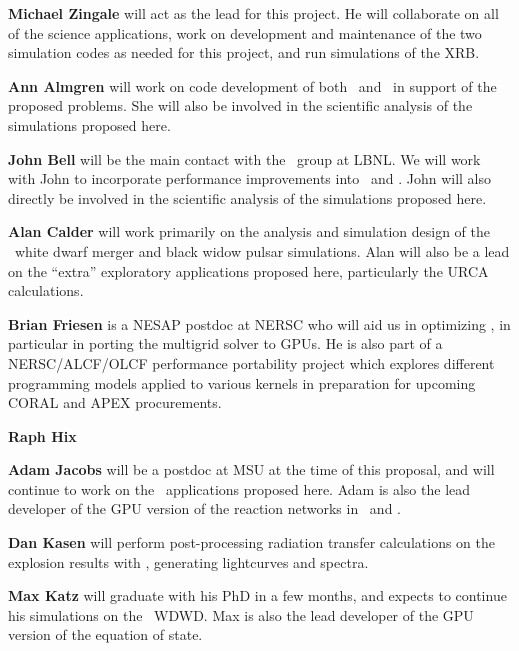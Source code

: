 \documentclass[11pt,letterpaper,english]{article}
\begin{document}
\begin{tightitem}
\item {\bf Michael Zingale} will act as the lead for this project.  He
  will collaborate on all of the science applications, work on
  development and maintenance of the two simulation codes as needed
  for this project, and run simulations of the XRB.

\item {\bf Ann Almgren} will work on code development of both \maestro\
  and \castro\ in support of the proposed problems.  She will also be
  involved in the scientific analysis of the simulations proposed here.

\item {\bf John Bell} will be the main contact with the \boxlib\ group
  at LBNL.  We will work with John to incorporate performance
  improvements into \maestro\ and \castro.  John will also directly be
  involved in the scientific analysis of the simulations proposed
  here.

\item {\bf Alan Calder} will work primarily on the analysis and
  simulation design of the \castro\ white dwarf merger and
  black widow pulsar simulations.
  Alan will also be a lead on the ``extra'' exploratory applications
  proposed here, particularly the URCA calculations.

\item {\bf Brian Friesen} is a NESAP postdoc at NERSC who will aid us in
  optimizing \boxlib, in particular in porting the multigrid solver to GPUs.
  He is also part of a NERSC/ALCF/OLCF performance portability project which
  explores different programming models applied to various kernels in
  preparation for upcoming CORAL and APEX procurements.

\item {\bf Raph Hix}

\item {\bf Adam Jacobs} will be a postdoc at MSU at the time of this
  proposal, and will continue to work on the \maestro\ applications
  proposed here.  Adam is also the lead developer of the GPU version
  of the reaction networks in \maestro\ and \castro.

\item {\bf Dan Kasen} will perform post-processing radiation transfer
  calculations on the explosion results with \sedona, generating
  lightcurves and spectra.

\item {\bf Max Katz} will graduate with his PhD in a few months, and
  expects to continue his simulations on the \castro\ WDWD.  Max is
  also the lead developer of the GPU version of the equation of state.


\end{tightitem}
\end{document}
